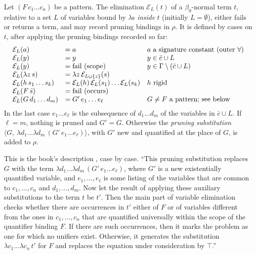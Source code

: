 \begin{definition}\label{def:hounif-elim}
Let $(F\,c_1\dots c_n)$ be a pattern. The elimination $\mathcal E_L(t)$ of a $\beta_0$-normal term $t$, relative to a
set $L$ of variables bound by $\lambda$s \emph{inside} $t$ (initially $L=\emptyset$), either fails or returns a term,
and may record pruning bindings in $\rho$. It is defined by cases on $t$, after applying the pruning bindings
recorded so far:
\[
\begin{array}{@{}l@{\quad}l@{\quad}l@{}}
  \mathcal E_L(a) &= a & a \text{ a signature constant (outer } \forall)\\
  \mathcal E_L(y) &= y & y\in\bar c\cup L\\
  \mathcal E_L(y) &= \text{fail (scope)} & y\in\Gamma\setminus(\bar c\cup L)\\
  \mathcal E_L(\lambda z\,s) &= \lambda z\,\mathcal E_{L\cup\{z\}}(s)\\
  \mathcal E_L(h\,s_1\dots s_k) &= \mathcal E_L(h)\,\mathcal E_L(s_1)\dots\mathcal E_L(s_k) & h \text{ rigid}\\
  \mathcal E_L(F\,\bar s) &= \text{fail (occurs)}\\
  \mathcal E_L(G\,d_1\dots d_m) &= G'\,e_1\dots e_\ell & G\ne F \text{ a pattern; see below}
\end{array}
\]
In the last case $e_1\dots e_\ell$ is the subsequence of $d_1\dots d_m$ of the variables in $\bar c\cup L$. If
$\ell=m$, nothing is pruned and $G'=G$. Otherwise the \emph{pruning substitution}
$\langle G,\ \lambda d_1\dots\lambda d_m\,(G'\,e_1\dots e_\ell)\rangle$, with $G'$ new and quantified at the place of $G$,
is added to $\rho$.
\end{definition}

This is the book's description , case by case. \enquote{This pruning substitution replaces $G$ with the term
$\lambda d_1\dots\lambda d_m\,(G'\,e_1\dots e_\ell)$, where $G'$ is a new existentially quantified variable, and
$e_1,\dots,e_\ell$ is some listing of the variables that are common to $c_1,\dots,c_n$ and $d_1,\dots,d_m$. Now let the
result of applying these auxiliary substitutions to the term $t$ be $t'$. Then the main part of variable
elimination checks whether there are occurrences in $t'$ either of $F$ or of variables different from the ones in
$c_1,\dots,c_n$ that are quantified universally within the scope of the quantifier binding $F$. If there are such
occurrences, then it marks the problem as one for which no unifiers exist. Otherwise, it generates the
substitution $\lambda c_1\dots\lambda c_n\,t'$ for $F$ and replaces the equation under consideration by $\top$.}

